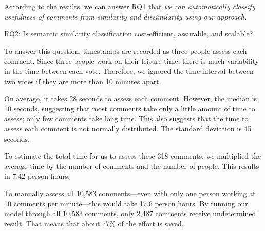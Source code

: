 According to the results, we can answer RQ1 that \emph{we can automatically classify usefulness of comments from similarity and dissimilarity using our approach.}








\begin{ResearchQuestions}
\item[RQ2:] Is semantic similarity classification cost-efficient, assurable, and scalable?
\end{ResearchQuestions}

To answer this question, timestamps are recorded as three people assess each comment.
Since three people work on their leisure time, there is much variability in the time between each vote.
Therefore, we ignored the time interval between two votes if they are more than 10 minutes apart.

On average, it takes 28 seconds to assess each comment.
However, the median is 10 seconds, suggesting that most comments take only a little amount of time to assess; only few comments take long time.
This also suggests that the time to assess each comment is not normally distributed.
The standard deviation is 45 seconds.

To estimate the total time for us to assess these 318 comments,
we multiplied the average time by the number of comments and the number of people.
This results in 7.42 person hours.

To manually assess all 10,583 comments---even with only one person working at 10 comments per minute---this would take 17.6 person hours.
By running our model through all 10,583 comments, only 2,487 comments receive undetermined result.
That means that about 77\% of the effort is saved.

















